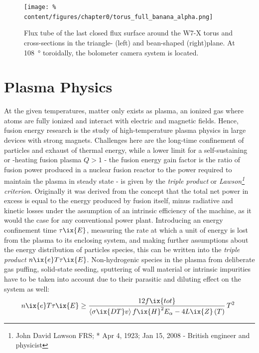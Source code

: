 %
        \begin{figure}%
            \centering%
            \texttt{[image: \%
                content/figures/chapter0/torus\_full\_banana\_alpha.png]}%
            \caption{Flux tube of the last closed flux surface around the W7-X torus and cross-sections in the triangle- (left) and bean-shaped (right)plane. At \SI{108}{\degree} toroidally, the bolometer camera system is located.}\label{fig:trianglebeanFS}%
        \end{figure}%
%
    \section{Plasma Physics}\label{sec:plasmaphysics}%
%
        At the given temperatures, matter only exists as plasma, an ionized gas where atoms are fully ionized and interact with electric and magnetic fields. Hence, fusion energy research is the study of high-temperature plasma physics in large devices with strong magnets. Challenges here are the long-time confinement of particles and exhaust of thermal energy, while a lower limit for a self-sustaining or -heating fusion plasma $Q>1$ - the fusion energy gain factor is the ratio of fusion power produced in a nuclear fusion reactor to the power required to maintain the plasma in steady state - is given by the \textit{triple product} or \textit{Lawson\footnote[1]{John David Lawson FRS; * Apr 4, 1923; \textdagger Jan 15, 2008 - British engineer and physicist} criterion}. Originally it was derived from the concept that the total net power in excess is equal to the energy produced by fusion itself, minus radiative and kinetic losses under the  assumption of an intrinsic efficiency of the machine, as it would the case for any conventional power plant. Introducing an energy confinement time $\tau\ix{E}$, measuring the rate at which a unit of energy is lost from the plasma to its enclosing system, and making further assumptions about the energy distribution of particles species, this can be written into the \textit{triple product} $n\ix{e}T\tau\ix{E}$. Non-hydrogenic species in the plasma from deliberate gas puffing, solid-state seeding, sputtering of wall material or intrinsic impurities have to be taken into account due to their parasitic and diluting effect on the system as well:%
%
        \begin{align}%
            n\ix{e}T\tau\ix{E}\ge\frac{12f\ix{tot}}{\left\langle\sigma\ix{DT}v\right\rangle f\ix{H}^{2}E_{\alpha}-4L\ix{Z}\left(T\right)}\,T^{2}\,\,\label{eq:lawson}%
        \end{align}%
